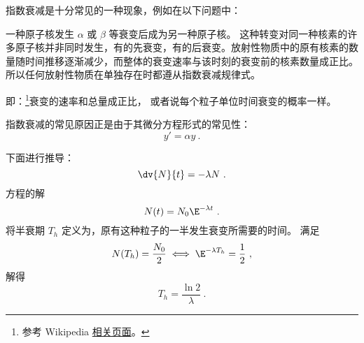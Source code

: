 
\begin{issues}
\issueDraft
\end{issues}


指数衰减是十分常见的一种现象，例如在以下问题中：

一种原子核发生 $\alpha$ 或 $\beta$ 等衰变后成为另一种原子核。
这种转变对同一种核素的许多原子核并非同时发生，有的先衰变，有的后衰变。放射性物质中的原有核素的数量随时间推移逐渐减少，而整体的衰变速率与该时刻的衰变前的核素数量成正比。
所以任何放射性物质在单独存在时都遵从指数衰减规律式。

即：\footnote{参考 Wikipedia \href{https://en.wikipedia.org/wiki/Exponential_decay}{相关页面}。}衰变的速率和总量成正比， 或者说每个粒子单位时间衰变的概率一样。

指数衰减的常见原因正是由于其微分方程形式的常见性：
$$y' = \alpha y ~.$$

下面进行推导：
\begin{equation}
\dv{N}{t} = -\lambda N~.
\end{equation}
方程的解
\begin{equation}
N(t) = N_0 \E^{-\lambda t}~.
\end{equation}
将半衰期 $T_h$ 定义为，原有这种粒子的一半发生衰变所需要的时间。 满足
\begin{equation}
N(T_h) = \frac{N_0}{2} \iff \E^{-\lambda T_h} = \frac{1}{2}~,
\end{equation}
解得
\begin{equation}
T_h = \frac{\ln 2}{\lambda}~.
\end{equation}
